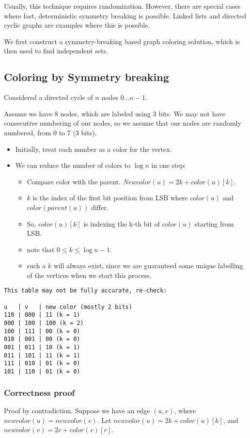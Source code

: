 Usually, this technique requires randomization. However, there are special
cases where fast, deterministic symmetry breaking is possible. Linked lists
and directed cyclic graphs are examples where this is possible.

We first construct a symmetry-breaking based graph coloring solution,
which is then used to find independent sets.

\subsection{Coloring by Symmetry breaking}
Considered a directed cycle of $n$ nodes $0 \dots n-1$.

Assume we have 8 nodes, which are labeled using 3 bits. We may not have
consecutive numbering of our nodes, so we assume that our nodes are randomly
numbered, from 0 to 7 (3 bits).


\begin{itemize}
    \item Initially, treat each number as a color for the vertex.
    \item We can reduce the number of colors to $\log n$ in one step:
    \begin{itemize}
    \item Compare color with the parent. $Newcolor(u) = 2 k + color(u)[k]$.
    \item $k$ is the index of the first bit position from LSB where $color(u)$ and $color(parent(u))$ differ.
    \item So, $color(u)[k]$ is indexing the k-th bit of $color(u)$ starting from LSB.
    \item note that $0 \leq k \leq \log n - 1$.
    \item such a $k$ will always exist, since we are guaranteed some unique
    labelling of the vertices when we start this process.
    \end{itemize}
\end{itemize}

\begin{verbatim}
This table may not be fully accurate, re-check:

u   | v   | new color (mostly 2 bits)
110 | 000 | 11 (k = 1)
000 | 100 | 100 (k = 2)
100 | 111 | 00 (k = 0)
010 | 001 | 00 (k = 0)
001 | 011 | 10 (k = 1)
011 | 101 | 11 (k = 1)
111 | 010 | 01 (k = 0)
101 | 110 | 01 (k = 0)
\end{verbatim}

\subsubsection{Correctness proof}
Proof by contradiction.
Suppose we have an edge $(u, v)$, where $newcolor(u) = newcolor(v)$.
Let $newcolor(u) = 2k + color(u)[k]$, and $newcolor(v) = 2r + color(v)[r]$.

